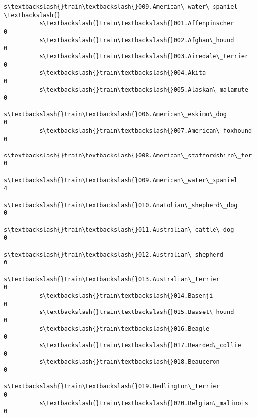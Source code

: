 \documentclass[11pt]{article}
\begin{document}
\begin{Verbatim}[commandchars=\\\{\}]
                                                          s\textbackslash{}train\textbackslash{}009.American\_water\_spaniel  \textbackslash{}
          s\textbackslash{}train\textbackslash{}001.Affenpinscher                                                        0   
          s\textbackslash{}train\textbackslash{}002.Afghan\_hound                                                         0   
          s\textbackslash{}train\textbackslash{}003.Airedale\_terrier                                                     0   
          s\textbackslash{}train\textbackslash{}004.Akita                                                                0   
          s\textbackslash{}train\textbackslash{}005.Alaskan\_malamute                                                     0   
          s\textbackslash{}train\textbackslash{}006.American\_eskimo\_dog                                                  0   
          s\textbackslash{}train\textbackslash{}007.American\_foxhound                                                    0   
          s\textbackslash{}train\textbackslash{}008.American\_staffordshire\_terrier                                       0   
          s\textbackslash{}train\textbackslash{}009.American\_water\_spaniel                                               4   
          s\textbackslash{}train\textbackslash{}010.Anatolian\_shepherd\_dog                                               0   
          s\textbackslash{}train\textbackslash{}011.Australian\_cattle\_dog                                                0   
          s\textbackslash{}train\textbackslash{}012.Australian\_shepherd                                                  0   
          s\textbackslash{}train\textbackslash{}013.Australian\_terrier                                                   0   
          s\textbackslash{}train\textbackslash{}014.Basenji                                                              0   
          s\textbackslash{}train\textbackslash{}015.Basset\_hound                                                         0   
          s\textbackslash{}train\textbackslash{}016.Beagle                                                               0   
          s\textbackslash{}train\textbackslash{}017.Bearded\_collie                                                       0   
          s\textbackslash{}train\textbackslash{}018.Beauceron                                                            0   
          s\textbackslash{}train\textbackslash{}019.Bedlington\_terrier                                                   0   
          s\textbackslash{}train\textbackslash{}020.Belgian\_malinois                                                     0   

\end{Verbatim}
\end{document}
